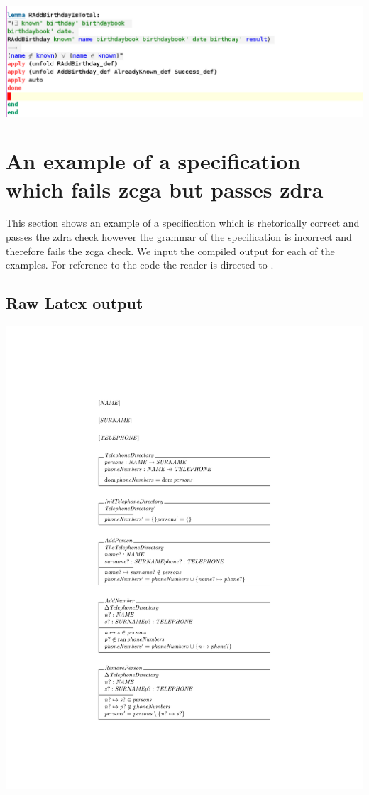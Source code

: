 \noindent \includegraphics[scale=0.4]{examples/bb/6imagee.png}
%

\section{An example of a specification which fails \gls{zcga} but passes \gls{zdra}}
This section shows an example of a specification which is rhetorically correct and passes the \gls{zdra} check however the grammar of the specification is incorrect and therefore fails the \gls{zcga} check. We input the compiled output for each of the examples. For reference to the code the reader is directed to \cite{mathlangexamples}.

%
\subsection{Raw Latex output}

\noindent \includegraphics[clip, trim=4cm 8cm 4cm 4.2cm]{examples/nonworkzcga/0.pdf}

